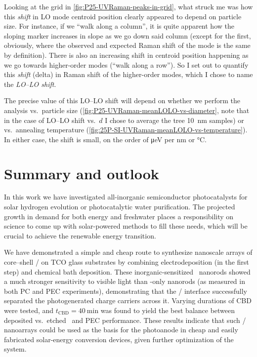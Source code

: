\documentclass[webedition,openright,titles,swedish,english]{LuaUUThesis}\usepackage[]{graphicx}\usepackage[]{xcolor}
\newcommand{\vs}{vs.}
\begin{document}
Looking at the grid in \cref{fig:P25-UVRaman-peaks-in-grid}, what struck me was
how this \emph{shift} in LO mode centroid position clearly appeared to depend
on particle size. For instance, if we \enquote{walk along a column}, it is
quite apparent how the sloping marker increases in slope as we go down said
column (except for the first, obviously, where the observed and expected Raman shift
of the mode is the same by definition).
There is also an increasing shift in centroid position happening as we go towards
higher-order modes (\enquote{walk along a row}).
So I set out to quantify this \emph{shift} (delta) in Raman shift of the higher-order modes,
which I chose to name the \emph{LO--LO shift}.


The precise value of this LO--LO shift will depend on whether we perform the analysis
\vs\ particle size (\cref{fig:P25-UVRaman-meanLOLO-vs-diameter}, note that in
the case of LO--LO shift \vs\ $d$ I chose to average the tree \qty{10}{\nm} samples)
or \vs\ annealing temperature (\cref{fig:25P-SI-UVRaman-meanLOLO-vs-temperature}).
In either case, the shift is small, on the order of \unit{\micro\eV} per \unit{\nm}
or \unit{\celsius}.




%

\chapter{Summary and outlook}
\label{ch:summary}

In this work we have investigated all-inorganic semiconductor photocatalysts
for solar hydrogen evolution or photocatalytic water purification.
The projected growth in demand for both energy and freshwater places a responsibility
on science to come up with solar-powered methods to fill these needs, which
will be crucial to achieve the renewable energy transition.


We have demonstrated a simple and cheap route to synthesize nanoscale arrays of core--shell
\ZnO/ on \gls{TCO} glass substrates by combining electrodeposition (in the first step)
and chemical bath deposition.
These inorganic-sensitized \ZnO\ nanorods showed a much stronger sensitivity to
visible light than \ZnO-only nanorods (as measured in both \gls{PC} and \gls{PEC} experiments),
demonstrating that the \ZnO/ interface successfully separated
the photogenerated charge carriers across it.
Varying durations of \gls{CBD} were tested, and $t_\mathrm{CBD}=\qty{40}{\minute}$
was found to yield the best balance between deposited  \vs\ etched \ZnO\
and \gls{PEC} performance.
These results indicate that such \ZnO/ nanoarrays could be used as the basis
for the photoanode in cheap and easily fabricated solar-energy conversion devices,
given further optimization of the system.
\end{document}
